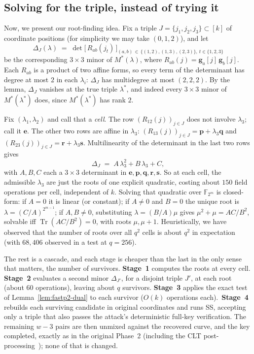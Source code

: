 \subsection{Solving for the triple, instead of trying it}

Now, we present our root-finding idea. Fix a triple $J = \{j_1,j_2,j_3\} \subset [k]$ of coordinate positions (for simplicity we may take $(0,1,2)$), and let
\[
    \Delta_J(\lambda) \;=\; \det\bigl[\, R_{ab}(j_t) \,\bigr]_{
    (a,b)\,\in\,\{(1,2),(1,3),(2,3)\},\ t\in\{1,2,3\}}
\]
be the corresponding $3\times 3$ minor of $M^{*}(\lambda)$,
where $R_{ab}(j) = \mathbf{g}_a[j]\,\mathbf{g}_b[j]$. Each
$R_{ab}$ is a product of two affine forms, so every term of the
determinant has degree at most $2$ in each $\lambda_i$:
$\Delta_J$ has multidegree at most $(2,2,2)$. By the lemma,
$\Delta_J$ vanishes at the true triple $\lambda^{*}$, and
indeed every $3\times 3$ minor of $M^{*}(\lambda^{*})$ does,
since $M^{*}(\lambda^{*})$ has rank $2$.

Fix $(\lambda_1,\lambda_2)$ and call that a \emph{cell}. The
row $(R_{12}(j))_{j\in J}$ does not involve $\lambda_3$; call
it $\mathbf{e}$. The other two rows are affine in $\lambda_3$:
$(R_{13}(j))_{j\in J} = \mathbf{p} + \lambda_3 \mathbf{q}$ and
$(R_{23}(j))_{j\in J} = \mathbf{r} + \lambda_3 \mathbf{s}$.
Multilinearity of the determinant in the last two rows gives
\[
    \Delta_J \;=\; A\,\lambda_3^{2} + B\,\lambda_3 + C,
\]
with $A, B, C$ each a $3\times 3$ determinant in
$\mathbf{e},\mathbf{p},\mathbf{q},\mathbf{r},\mathbf{s}$.
So at each cell, the admissible $\lambda_3$ are just the roots
of one explicit quadratic, costing about $150$ field operations
per cell, independent of $k$. Solving that quadratic over
$\mathbb{F}_{2^m}$ is closed-form: if $A = 0$ it is linear (or
constant); if $A \neq 0$ and $B = 0$ the unique root is
$\lambda = (C/A)^{2^{m-1}}$; if $A,B \neq 0$, substituting
$\lambda = (B/A)\mu$ gives $\mu^2 + \mu = AC/B^2$, solvable
iff $\operatorname{Tr}(AC/B^2) = 0$, with roots $\mu, \mu+1$.
Heuristically, we have observed that the number of roots over all $q^2$ cells is about $q^2$ in
expectation (with $68{,}406$ observed in a test at $q=256$).

The rest is a cascade, and each stage is cheaper than the last
in the only sense that matters, the number of survivors.
\textbf{Stage~1} computes the roots at every cell.
\textbf{Stage~2} evaluates a second minor $\Delta_{J'}$, for a
disjoint triple $J'$, at each root (about $60$ operations),
leaving about $q$ survivors. \textbf{Stage~3} applies the exact
test of Lemma~\ref{lem:fastp2-dual} to each survivor ($O(k)$
operations each).~\textbf{Stage~4} rebuilds each surviving
candidate in original coordinates and runs SS, accepting only
a triple that also passes the attack's deterministic full-key
verification. The remaining $w - 3$ pairs are then unmixed
against the recovered curve, and the key completed, exactly as
in the original Phase~2 (including the CLT
post-processing~\cite{CLT18}); none of that is changed.

